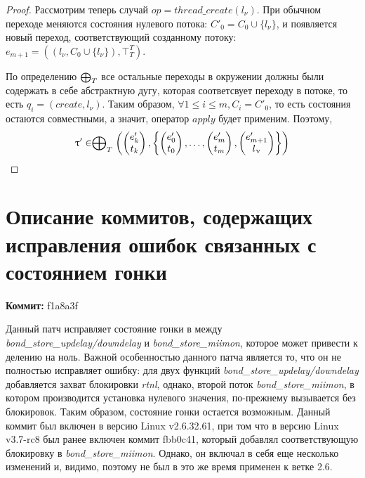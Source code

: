 \begin{proof}
Рассмотрим теперь случай $op = thread\_create(l_{\nu})$.
При обычном переходе меняются состояния нулевого потока: $C'_0 = C_0 \cup \{l_{\nu}\}$, и появляется новый переход, соответствующий созданному потоку: $e_{m+1} = ((l_{\nu},C_0 \cup \{l_{\nu}\}) , \top^T_T)$.

По определению $\mathrel{\bigoplus}_T$ все остальные переходы в окружении должны были содержать в себе абстрактную дугу, которая соответсвует переходу в потоке, то есть $q_i = (create, l_{\nu})$.
Таким образом, $\forall 1 \le i \le m, C_i = C'_0$, то есть состояния остаются совместными, а значит, оператор $apply$ будет применим.
Поэтому, 
$$\uptau' \in  \mathrel{\bigoplus}_{T}
\left(
\begin{pmatrix}
e'_k \\
t_k 
\end{pmatrix},
\left\{
\begin{pmatrix}
e'_0 \\
t_0 
\end{pmatrix},
\dots ,
\begin{pmatrix}
e'_m \\
t_m 
\end{pmatrix} ,
\begin{pmatrix}
e'_{m+1} \\
l_{\upnu} 
\end{pmatrix}
\right\}
\right)$$

\end{proof}


\section{Описание коммитов, содержащих исправления ошибок связанных с состоянием гонки}
\label{sect_commits_desc}

\textbf{Коммит:} f1a8a3f

Данный патч исправляет состояние гонки в между \textit{bond\_store\_updelay/downdelay}
и \textit{bond\_store\_miimon}, которое может привести к делению на ноль.
Важной особенностью данного патча является то, что он не полностью исправляет ошибку: для двух функций \textit{bond\_store\_updelay/downdelay} добавляется захват блокировки \textit{rtnl}, однако, второй поток \textit{bond\_store\_miimon}, в котором производится установка нулевого значения, по-прежнему вызывается без блокировок.
Таким образом, состояние гонки остается возможным.
Данный коммит был включен в версию Linux v2.6.32.61, при том что в версию Linux v3.7-rc8 был ранее включен коммит fbb0c41, который добавлял соответствующую блокировку в \textit{bond\_store\_miimon}.
Однако, он включал в себя еще несколько изменений и, видимо, поэтому не был в это же время применен к ветке 2.6.

